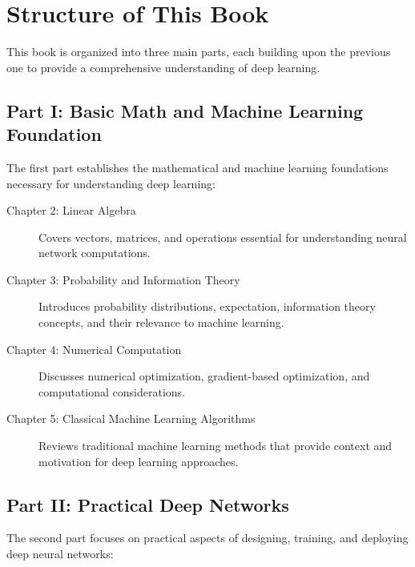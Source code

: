
\section{Structure of This Book}
\label{sec:book-structure}

This book is organized into three main parts, each building upon the previous one to provide a comprehensive understanding of deep learning.

\subsection{Part I: Basic Math and Machine Learning Foundation}

The first part establishes the mathematical and machine learning foundations necessary for understanding deep learning:

\begin{description}
    \item[Chapter 2: Linear Algebra] Covers vectors, matrices, and operations essential for understanding neural network computations.
    
    \item[Chapter 3: Probability and Information Theory] Introduces probability distributions, expectation, information theory concepts, and their relevance to machine learning.
    
    \item[Chapter 4: Numerical Computation] Discusses numerical optimization, gradient-based optimization, and computational considerations.
    
    \item[Chapter 5: Classical Machine Learning Algorithms] Reviews traditional machine learning methods that provide context and motivation for deep learning approaches.
\end{description}

\subsection{Part II: Practical Deep Networks}

The second part focuses on practical aspects of designing, training, and deploying deep neural networks:

